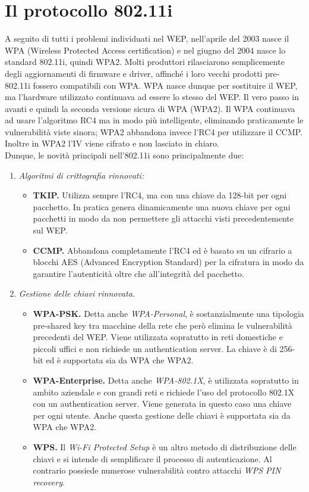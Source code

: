 \section{Il protocollo 802.11i}
A seguito di tutti i problemi individuati nel WEP, nell'aprile del 2003 nasce il WPA (Wireless Protected Access certification) e nel giugno del 2004 nasce lo standard 802.11i, quindi WPA2. Molti produttori rilasciarono semplicemente degli aggiornamenti di firmware e driver, affinché i loro vecchi prodotti pre-802.11i fossero compatibili con WPA. WPA nasce dunque per sostituire il WEP, ma l'hardware utilizzato continuava ad essere lo stesso del WEP. Il vero passo in avanti e quindi la seconda versione sicura di WPA (WPA2). Il WPA continuava ad usare l'algoritmo RC4 ma in modo più intelligente, eliminando praticamente le vulnerabilità viste sinora; WPA2 abbandona invece l'RC4 per utilizzare il CCMP. Inoltre in WPA2 l'IV viene cifrato e non lasciato in chiaro. \\
Dunque, le novità principali nell'802.11i sono principalmente due:
\begin{enumerate}
	\item \textit{Algoritmi di crittografia rinnovati:}
	\begin{itemize}
	\item \textbf{TKIP.} Utilizza sempre l'RC4, ma con una chiave da 128-bit per ogni pacchetto. In pratica genera dinamicamente una nuova chiave per ogni pacchetti in modo da non permettere gli attacchi visti precedentemente sul WEP.
	\item	 \textbf{CCMP.} Abbandona completamente l'RC4 ed è basato su un cifrario a blocchi AES (Advanced Encryption Standard) per la cifratura in modo da garantire l'autenticità oltre che all'integrità del pacchetto.
	\end{itemize}
	\item \textit{Gestione delle chiavi rinnovata.} 
	\begin{itemize}
	\item \textbf{WPA-PSK.} Detta anche \textit{WPA-Personal}, è sostanzialmente una tipologia pre-shared key tra macchine della rete che però elimina le vulnerabilità precedenti del WEP. Viene utilizzata sopratutto in reti domestiche e piccoli uffici e non richiede un authentication server. La chiave è di 256-bit ed è supportata sia da WPA che WPA2. 
	\item	 \textbf{WPA-Enterprise.} Detta anche \textit{WPA-802.1X}, è utilizzata sopratutto in ambito aziendale e con grandi reti e richiede l'uso del protocollo 802.1X con un authentication server. Viene generata in questo caso una chiave per ogni utente. Anche questa gestione delle chiavi è supportata sia da WPA che WPA2.
	\item \textbf{WPS.} Il \textit{Wi-Fi Protected Setup} è un altro metodo di distribuzione delle chiavi e si intende di semplificare il processo di autenticazione. Al contrario possiede numerose vulnerabilità contro attacchi \textit{WPS PIN recovery}.
	\end{itemize}

\end{enumerate}
